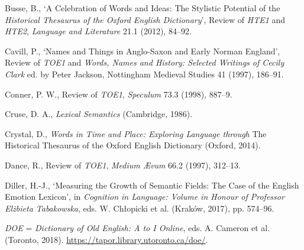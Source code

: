 \begin{list}{}
\item %
Busse, B., `A Celebration of Words and Ideas: The Stylistic Potential of the \textit{Historical Thesaurus of the Oxford English Dictionary}', Review of \textit{HTE1} and \textit{HTE2}, \textit{Language and Literature} 21.1 (2012), 84–92.

\item %
Cavill, P., `Names and Things in Anglo-Saxon and Early Norman England', Review of \textit{TOE1} and \textit{Words, Names and History: Selected Writings of Cecily Clark} ed. by Peter Jackson, Nottingham Medieval Studies 41 (1997), 186–91.




\item %
Conner, P. W., Review of \textit{TOE1}, \textit{Speculum} 73.3 (1998), 887–9.

\item %
Cruse, D. A., \textit{Lexical Semantics} (Cambridge, 1986).

\item %
Crystal, D., \textit{Words in Time and Place: Exploring Language through} The Historical Thesaurus of the Oxford English Dictionary (Oxford, 2014).

\item %
Dance, R., Review of \textit{TOE1}, \textit{Medium Ævum} 66.2 (1997), 312–13.


\item %
Diller, H.-J., `Measuring the Growth of Semantic Fields: The Case of the English Emotion Lexicon', in \textit{Cognition in Language: Volume in Honour of Professor Elżbieta Tabakowska}, eds. W. Chłopicki et al.%
(Kraków, 2017), pp. 574–96.

\item %
\textit{DOE} = \textit{Dictionary of Old English: A to I Online}, eds. A. Cameron et al. (Toronto, 2018). \url{https://tapor.library.utoronto.ca/doe/}.


\end{list}
